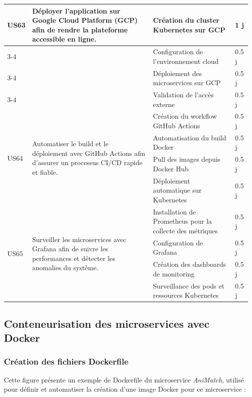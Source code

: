 \begin{longtable}{|p{1cm}|p{4.7cm}|p{7cm}|p{1.3cm}|}
\multirow{4}{2cm}{US63}
& \multirow{4}{5cm}{Déployer l’application sur Google Cloud Platform (GCP) afin de rendre la plateforme accessible en ligne.}
& Création du cluster Kubernetes sur GCP & 1 j \\
\cline{3-4}
& & Configuration de l’environnement cloud & 0.5 j \\
\cline{3-4}
& & Déploiement des microservices sur GCP & 0.5 j \\
\cline{3-4}
& & Validation de l’accès externe & 0.5 j \\
\hline

\multirow{4}{2cm}{US64}
& \multirow{4}{5cm}{Automatiser le build et le déploiement avec GitHub Actions afin d’assurer un processus CI/CD rapide et fiable.}
& Création du workflow GitHub Actions & 0.5 j \\
\cline{3-4}
& & Automatisation du build Docker & 0.5 j \\
\cline{3-4}
& & Pull des images depuis Docker Hub & 0.5 j \\
\cline{3-4}
& & Déploiement automatique sur Kubernetes & 0.5 j \\
\hline

\multirow{4}{2cm}{US65}
& \multirow{4}{5cm}{Surveiller les microservices avec Grafana afin de suivre les performances et détecter les anomalies du système.}
& Installation de Prometheus pour la collecte des métriques & 0.5 j \\
\cline{3-4}
& & Configuration de Grafana & 0.5 j \\
\cline{3-4}
& & Création des dashboards de monitoring & 0.5 j \\
\cline{3-4}
& & Surveillance des pods et ressources Kubernetes & 0.5 j \\
\hline
\end{longtable}  


\subsection{Conteneurisation des microservices avec Docker}  

\subsubsection{Création des fichiers Dockerfile}

Cette figure présente un exemple de Dockerfile du microservice \textit{AniMatch}, utilisé pour définir et automatiser la création d’une image Docker pour ce microservice :   

